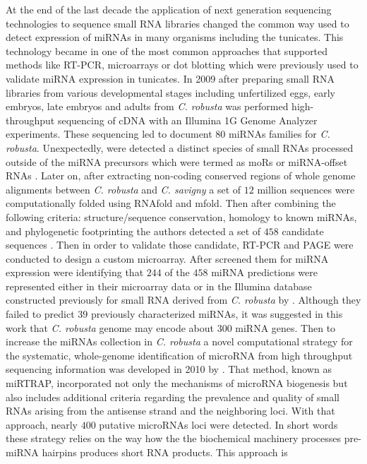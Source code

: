 \documentclass[graybox]{svmult}
\begin{document}
At the end of the last decade the application of next generation sequencing 
technologies to sequence small RNA libraries changed the common way used to 
detect expression of miRNAs in many organisms including the tunicates. This 
technology became in one of the most common approaches that supported methods 
like RT-PCR, microarrays or dot blotting which were previously used to validate 
miRNA expression in tunicates. In 2009 after preparing small RNA libraries from 
various developmental stages including unfertilized eggs, early embryos, late 
embryos and adults from  \textit{C. robusta} was performed high-throughput 
sequencing of cDNA with an Illumina 1G Genome Analyzer experiments. These 
sequencing led to document $80$ miRNAs families for  \textit{C. robusta}. 
Unexpectedly, were detected a distinct species of small RNAs processed outside 
of the miRNA precursors which were termed as moRs or miRNA-offset RNAs 
\cite{Shi2009}. Later on, after extracting non-coding conserved regions of 
whole 
genome alignments between  \textit{C. robusta} and \textit{C. savigny} a 
set of $12$ million sequences were computationally folded using RNAfold and 
mfold. Then after combining the following criteria: structure/sequence 
conservation, homology to known miRNAs, and phylogenetic footprinting the 
authors detected a set of $458$ candidate sequences \cite{Keshavan2010}. Then 
in order to validate those candidate, RT-PCR and PAGE were conducted to design 
a custom microarray. After screened them for miRNA expression were identifying 
that $244$ of the $458$ miRNA predictions were represented either in their 
microarray data or in the Illumina database constructed previously for small 
RNA 
derived from \textit{C. robusta} by \cite{Shi2009}. Although they failed to 
predict $39$ previously characterized miRNAs, it was suggested in this work 
that 
\textit{C. robusta} genome may encode about $300$ miRNA genes. Then to 
increase the miRNAs collection in \textit{C. robusta} a novel computational 
strategy for the systematic, whole-genome identification of microRNA from high 
throughput sequencing information was developed in 2010 by \cite{Hendrix2010}. 
That method, known as miRTRAP, incorporated not only the mechanisms of microRNA 
biogenesis but also includes additional criteria regarding the prevalence and 
quality of small RNAs arising from the antisense strand and the neighboring 
loci. With that approach, nearly $400$ putative microRNAs loci were detected. 
In 
short words these strategy relies on the way how the the biochemical machinery 
processes pre-miRNA hairpins produces short RNA products. This approach is 
\end{document}
